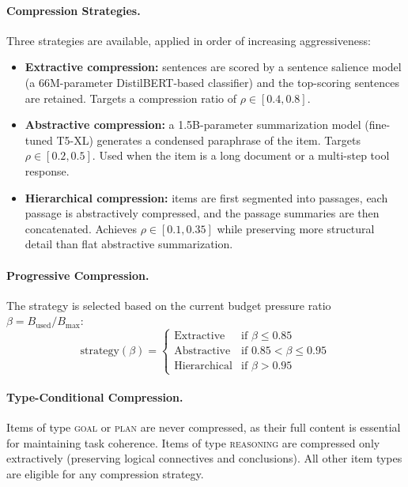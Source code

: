\documentclass[review,12pt]{elsarticle}
\begin{document}
\paragraph{Compression Strategies.}
Three strategies are available, applied in order of increasing aggressiveness:
\begin{itemize}
  \item \textbf{Extractive compression:} sentences are scored by a sentence
  salience model (a 66M-parameter DistilBERT-based classifier) and the
  top-scoring sentences are retained.  Targets a compression ratio of $\rho \in
  [0.4, 0.8]$.
  \item \textbf{Abstractive compression:} a 1.5B-parameter summarization model
  (fine-tuned T5-XL) generates a condensed paraphrase of the item.  Targets
  $\rho \in [0.2, 0.5]$.  Used when the item is a long document or a multi-step
  tool response.
  \item \textbf{Hierarchical compression:} items are first segmented into
  passages, each passage is abstractively compressed, and the passage summaries
  are then concatenated.  Achieves $\rho \in [0.1, 0.35]$ while preserving more
  structural detail than flat abstractive summarization.
\end{itemize}

\paragraph{Progressive Compression.}
The strategy is selected based on the current budget pressure ratio
$\beta = B_{\text{used}} / B_{\max}$:
\begin{equation}
  \text{strategy}(\beta) =
  \begin{cases}
    \text{Extractive}   & \text{if } \beta \leq 0.85 \\
    \text{Abstractive}  & \text{if } 0.85 < \beta \leq 0.95 \\
    \text{Hierarchical} & \text{if } \beta > 0.95
  \end{cases}
  \label{eq:compression-strategy}
\end{equation}

\paragraph{Type-Conditional Compression.}
Items of type \textsc{goal} or \textsc{plan} are never compressed, as their
full content is essential for maintaining task coherence.  Items of type
\textsc{reasoning} are compressed only extractively (preserving logical
connectives and conclusions).  All other item types are eligible for any
compression strategy.
\end{document}
